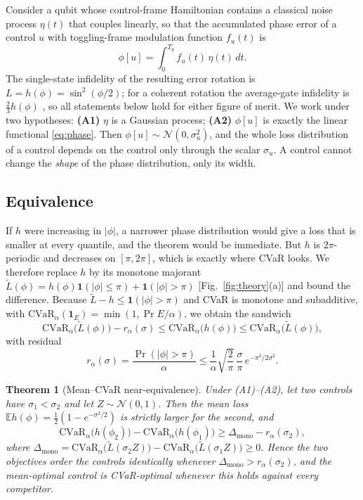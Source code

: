 \documentclass[aps,pra,twocolumn,superscriptaddress,reprint,nofootinbib,floatfix]{revtex4-2}
\newtheorem{theorem}{Theorem}
\theoremstyle{definition}
\newcommand{\cvar}{\mathrm{CVaR}}
\newcommand{\E}{\mathbb{E}}
\newcommand{\Lt}{\widetilde L}
\begin{document}
Consider a qubit whose control-frame Hamiltonian contains a classical noise
process $\eta(t)$ that couples linearly, so that the accumulated phase error
of a control $u$ with toggling-frame modulation function $f_u(t)$ is
\begin{equation}
\phi[u]=\int_0^{T_g}f_u(t)\,\eta(t)\,dt .
\label{eq:phase}
\end{equation}
The single-state infidelity of the resulting error rotation is
$L=h(\phi)=\sin^2(\phi/2)$; for a coherent rotation the average-gate
infidelity is $\tfrac23h(\phi)$ \cite{Nielsen2002}, so all statements below
hold for either figure of merit. We work under two hypotheses:
\textbf{(A1)} $\eta$ is a Gaussian process; \textbf{(A2)} $\phi[u]$ is
exactly the linear functional \eqref{eq:phase}. Then
$\phi[u]\sim\mathcal N(0,\sigma_u^2)$, and the whole loss distribution of a
control depends on the control only through the scalar $\sigma_u$. A control
cannot change the \emph{shape} of the phase distribution, only its width.

\subsection{Equivalence}

If $h$ were increasing in $|\phi|$, a narrower phase distribution would give
a loss that is smaller at every quantile, and the theorem would be immediate.
But $h$ is $2\pi$-periodic and decreases on $[\pi,2\pi]$, which is exactly
where CVaR looks. We therefore replace $h$ by its monotone majorant
$\Lt(\phi)=h(\phi)\mathbf 1(|\phi|\le\pi)+\mathbf 1(|\phi|>\pi)$
[Fig.~\ref{fig:theory}(a)] and bound the difference. Because
$\Lt-h\le\mathbf 1(|\phi|>\pi)$ and CVaR is monotone and subadditive, with
$\cvar_\alpha(\mathbf 1_E)=\min(1,\Pr E/\alpha)$, we obtain the sandwich
\begin{equation}
\cvar_\alpha\big(\Lt(\phi)\big)-r_\alpha(\sigma)\le\cvar_\alpha\big(h(\phi)\big)\le\cvar_\alpha\big(\Lt(\phi)\big),
\label{eq:sandwich}
\end{equation}
with residual
\begin{equation}
r_\alpha(\sigma)=\frac{\Pr(|\phi|>\pi)}{\alpha}\le\frac1\alpha\sqrt{\frac2\pi}\,\frac{\sigma}{\pi}\,e^{-\pi^2/2\sigma^2}.
\label{eq:residual}
\end{equation}

\begin{theorem}[Mean--CVaR near-equivalence]
\label{thm:main}
Under (A1)--(A2), let two controls have $\sigma_1<\sigma_2$ and let
$Z\sim\mathcal N(0,1)$. Then the mean loss
$\E h(\phi)=\tfrac12(1-e^{-\sigma^2/2})$ is strictly larger for the second,
and
\begin{equation*}
\cvar_\alpha\big(h(\phi_2)\big)-\cvar_\alpha\big(h(\phi_1)\big)\ge\Delta_{\mathrm{mono}}-r_\alpha(\sigma_2),
\end{equation*}
where $\Delta_{\mathrm{mono}}=\cvar_\alpha\big(\Lt(\sigma_2Z)\big)-\cvar_\alpha\big(\Lt(\sigma_1Z)\big)\ge0$.
Hence the two objectives order the controls identically whenever
$\Delta_{\mathrm{mono}}>r_\alpha(\sigma_2)$, and the mean-optimal control
is CVaR-optimal whenever this holds against every competitor.
\end{theorem}
\end{document}
